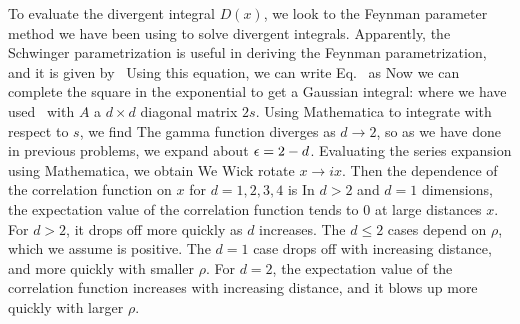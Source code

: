 \documentclass[11pt]{article}
\begin{document}
{	To evaluate the divergent integral $D(x)$, we look to the Feynman parameter method we have been using to solve divergent integrals.  Apparently, the Schwinger parametrization is useful in deriving the Feynman parametrization, and it is given by~\cite{Feynman}
	Using this equation, we can write Eq.~ as
	Now we can complete the square in the exponential to get a Gaussian integral:
	where we have used~\cite{QFT}
	with $A$ a $d \times d$ diagonal matrix $2s$.  Using Mathematica to integrate with respect to $s$, we find
	The gamma function diverges as $d \to 2$, so as we have done in previous problems, we expand about $\epsilon = 2 - d$.  Evaluating the series expansion using Mathematica, we obtain
	We Wick rotate $x \to i x$.  Then the dependence of the correlation function on $x$ for $d = 1, 2, 3, 4$ is
	In $d > 2$ and $d = 1$ dimensions, the expectation value of the correlation function tends to 0 at large distances $x$.  For $d > 2$, it drops off more quickly as $d$ increases.  The $d \leq 2$ cases depend on $\rho$, which we assume is positive.  The $d = 1$ case drops off with increasing distance, and more quickly with smaller $\rho$.  For $d = 2$, the expectation value of the correlation function increases with increasing distance, and it blows up more quickly with larger $\rho$.
	
}
\end{document}

